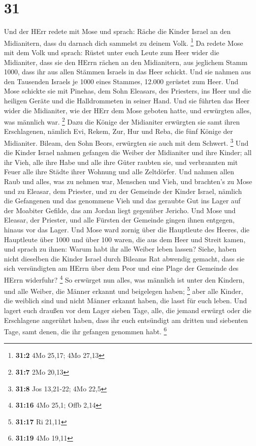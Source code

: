\hypertarget{section-30}{%
\section{31}\label{section-30}}

 Und der HErr redete mit Mose und sprach: 
Räche die Kinder Israel an den Midianitern, dass du darnach dich
sammelst zu deinem Volk. \footnote{\textbf{31:2} 4Mo 25,17; 4Mo 27,13}
 Da redete Mose mit dem Volk und sprach: Rüstet unter euch
Leute zum Heer wider die Midianiter, dass sie den HErrn rächen an den
Midianitern,  aus jeglichem Stamm 1000, dass ihr aus allen
Stämmen Israels in das Heer schickt.  Und sie nahmen aus
den Tausenden Israels je 1000 eines Stammes, 12.000 gerüstet zum Heer.
 Und Mose schickte sie mit Pinehas, dem Sohn Eleasars, des
Priesters, ins Heer und die heiligen Geräte und die Halldrommeten in
seiner Hand.  Und sie führten das Heer wider die
Midianiter, wie der HErr dem Mose geboten hatte, und erwürgten alles,
was männlich war. \footnote{\textbf{31:7} 2Mo 20,13}  Dazu
die Könige der Midianiter erwürgten sie samt ihren Erschlagenen, nämlich
Evi, Rekem, Zur, Hur und Reba, die fünf Könige der Midianiter. Bileam,
den Sohn Beors, erwürgten sie auch mit dem Schwert. \footnote{\textbf{31:8}
  Jos 13,21-22; 4Mo 22,5}  Und die Kinder Israel nahmen
gefangen die Weiber der Midianiter und ihre Kinder; all ihr Vieh, alle
ihre Habe und alle ihre Güter raubten sie,  und
verbrannten mit Feuer alle ihre Städte ihrer Wohnung und alle
Zeltdörfer.  Und nahmen allen Raub und alles, was zu
nehmen war, Menschen und Vieh,  und brachten's zu Mose
und zu Eleasar, dem Priester, und zu der Gemeinde der Kinder Israel,
nämlich die Gefangenen und das genommene Vieh und das geraubte Gut ins
Lager auf der Moabiter Gefilde, das am Jordan liegt gegenüber Jericho.
 Und Mose und Eleasar, der Priester, und alle Fürsten der
Gemeinde gingen ihnen entgegen, hinaus vor das Lager. 
Und Mose ward zornig über die Hauptleute des Heeres, die Hauptleute über
1000 und über 100 waren, die aus dem Heer und Streit kamen,
 und sprach zu ihnen: Warum habt ihr alle Weiber leben
lassen?  Siehe, haben nicht dieselben die Kinder Israel
durch Bileams Rat abwendig gemacht, dass sie sich versündigten am HErrn
über dem Peor und eine Plage der Gemeinde des HErrn widerfuhr?
\footnote{\textbf{31:16} 4Mo 25,1; Offb 2,14}  So
erwürget nun alles, was männlich ist unter den Kindern, und alle Weiber,
die Männer erkannt und beigelegen haben; \footnote{\textbf{31:17} Ri
  21,11}  aber alle Kinder, die weiblich sind und nicht
Männer erkannt haben, die lasst für euch leben.  Und
lagert euch draußen vor dem Lager sieben Tage, alle, die jemand erwürgt
oder die Erschlagene angerührt haben, dass ihr euch entsündigt am
dritten und siebenten Tage, samt denen, die ihr gefangen genommen habt.
\footnote{\textbf{31:19} 4Mo 19,11}

